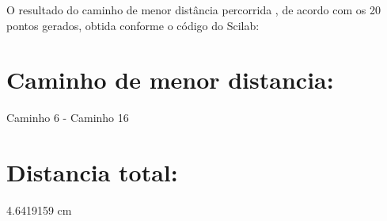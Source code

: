 O resultado do caminho de menor distância percorrida , de acordo com os 20 pontos gerados, obtida conforme o código do Scilab:

 \section*{Caminho de menor distancia:} Caminho 6 - Caminho 16 
 \\
 \section*{Distancia total:} 4.6419159 cm









